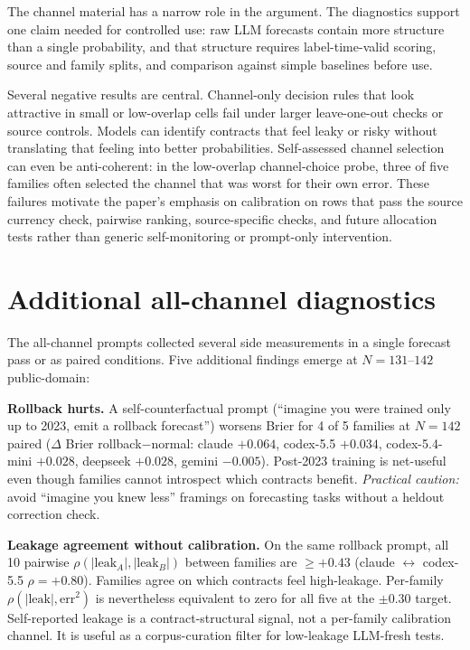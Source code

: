 \documentclass[11pt]{article}
\begin{document}
The channel material has a narrow role in the argument. The diagnostics support one claim needed for controlled use: raw LLM forecasts contain more structure than a single probability, and that structure requires label-time-valid scoring, source and family splits, and comparison against simple baselines before use.

Several negative results are central. Channel-only decision rules that look attractive in small or low-overlap cells fail under larger leave-one-out checks or source controls. Models can identify contracts that feel leaky or risky without translating that feeling into better probabilities. Self-assessed channel selection can even be anti-coherent: in the low-overlap channel-choice probe, three of five families often selected the channel that was worst for their own error. These failures motivate the paper's emphasis on calibration on rows that pass the source currency check, pairwise ranking, source-specific checks, and future allocation tests rather than generic self-monitoring or prompt-only intervention.

\section{Additional all-channel diagnostics}
\label{sec:all-channel-diagnostics}

The all-channel prompts collected several side measurements in a single forecast pass or as paired conditions. Five additional findings emerge at $N{=}131$--$142$ public-domain:

\textbf{Rollback hurts.} A self-counterfactual prompt (``imagine you were trained only up to 2023, emit a rollback forecast'') worsens Brier for 4 of 5 families at $N{=}142$ paired ($\Delta$ Brier rollback$-$normal: claude $+0.064$, codex-5.5 $+0.034$, codex-5.4-mini $+0.028$, deepseek $+0.028$, gemini $-0.005$). Post-2023 training is net-useful even though families cannot introspect which contracts benefit. \emph{Practical caution:} avoid ``imagine you knew less'' framings on forecasting tasks without a heldout correction check.

\textbf{Leakage agreement without calibration.} On the same rollback prompt, all 10 pairwise $\rho(|\text{leak}_A|, |\text{leak}_B|)$ between families are $\geq +0.43$ (claude $\leftrightarrow$ codex-5.5 $\rho{=}+0.80$). Families agree on which contracts feel high-leakage. Per-family $\rho(|\text{leak}|, \text{err}^2)$ is nevertheless equivalent to zero for all five at the $\pm 0.30$ target. Self-reported leakage is a contract-structural signal, not a per-family calibration channel. It is useful as a corpus-curation filter for low-leakage LLM-fresh tests.
\end{document}
